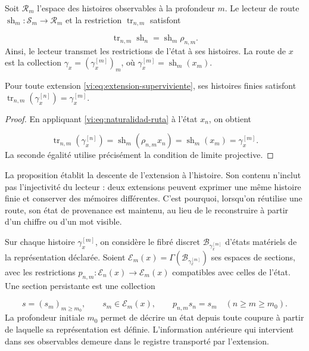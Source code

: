 Soit $\mathcal R_m$ l’espace des histoires observables à la profondeur $m$.
Le lecteur de route $\operatorname{sh}_m:\mathcal S_m\to\mathcal R_m$
et la restriction $\operatorname{tr}_{n,m}$ satisfont

\begin{equation}
 \operatorname{tr}_{n,m}\operatorname{sh}_n
 =\operatorname{sh}_m\rho_{n,m}.
 \label{vi:eq:naturalidad-ruta}
\end{equation}
Ainsi, le lecteur transmet les restrictions de l’état à ses histoires.
La route de $x$ est la collection
$\gamma_x=(\gamma_x^{[m]})_m$, où
$\gamma_x^{[m]}=\operatorname{sh}_m(x_m)$.


\begin{proposition}
\label{vi:prop:historia-compatible}
Pour toute extension \eqref{vi:eq:extension-superviviente}, ses histoires
finies satisfont
$\operatorname{tr}_{n,m}(\gamma_x^{[n]})=\gamma_x^{[m]}$.

\end{proposition}
\begin{proof}
En appliquant \eqref{vi:eq:naturalidad-ruta} à l’état $x_n$, on obtient

\[
 \operatorname{tr}_{n,m}(\gamma_x^{[n]})
 =\operatorname{sh}_m(\rho_{n,m}x_n)
 =\operatorname{sh}_m(x_m)=\gamma_x^{[m]}.
\]
La seconde égalité utilise précisément la condition de limite projective.

\end{proof}

La proposition établit la descente de l’extension à l’histoire.
Son contenu n’inclut pas l’injectivité du lecteur : deux extensions
peuvent exprimer une même histoire finie et conserver des mémoires différentes.
C’est pourquoi, lorsqu’on réutilise une route, son état de provenance est maintenu,
au lieu de le reconstruire à partir d’un chiffre ou d’un mot visible.


Sur chaque histoire $\gamma_x^{[m]}$, on considère le fibré discret
$\mathcal B_{\gamma_x^{[m]}}$ d’états matériels de la représentation
déclarée. Soient
$\mathscr E_m(x)=\Gamma(\mathcal B_{\gamma_x^{[m]}})$ ses espaces
de sections, avec les restrictions
$p_{n,m}:\mathscr E_n(x)\to\mathscr E_m(x)$ compatibles avec celles
de l’état. Une section persistante est une collection

\begin{equation}
 s=(s_m)_{m\geq m_0},\qquad s_m\in\mathscr E_m(x),\qquad
 p_{n,m}s_n=s_m\quad(n\geq m\geq m_0).
 \label{vi:eq:seccion-persistente}
\end{equation}
La profondeur initiale $m_0$ permet de décrire un état depuis toute
coupure à partir de laquelle sa représentation est définie. L’information
antérieure qui intervient dans ses observables demeure dans le registre
transporté par l’extension.


